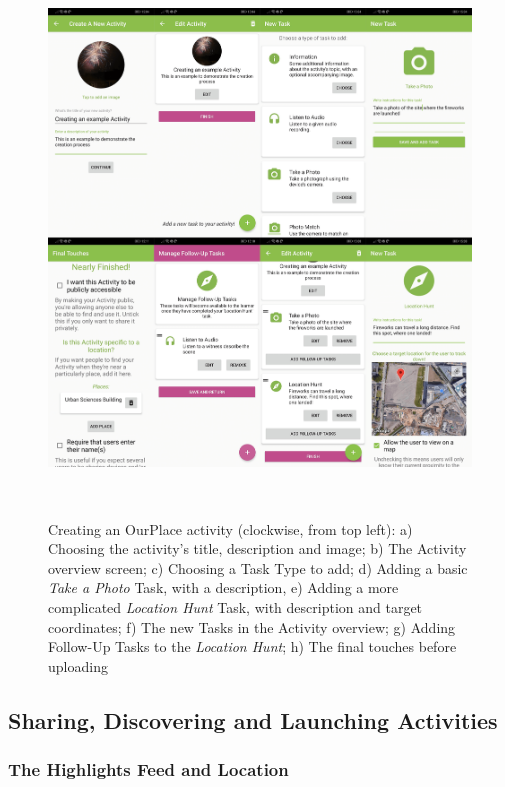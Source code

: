 \begin{figure}
  \centering
  \includegraphics[width=1\columnwidth]{images/chapter05/creation.png}
  \caption[Creating an OurPlace activity]{Creating an OurPlace activity (clockwise, from top left): a) Choosing the activity's title, description and image; b) The Activity overview screen; c) Choosing a Task Type to add; d) Adding a basic \textit{Take a Photo} Task, with a description, e) Adding a more complicated \textit{Location Hunt} Task, with description and target coordinates; f) The new Tasks in the Activity overview; g) Adding Follow-Up Tasks to the \textit{Location Hunt}; h) The final touches before uploading }~\label{fig:ActivityCreation}
\end{figure}

\subsection{Sharing, Discovering and Launching Activities}
\label{sec:SharingActivities}

\subsubsection{The Highlights Feed and Location}

